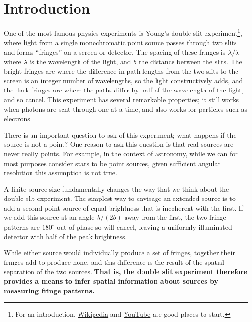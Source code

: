 \documentclass[11pt]{article}
\begin{document}
\section{Introduction}

One of the most famous physics experiments is Young's double slit experiment\footnote{For an introduction, \href{https://en.wikipedia.org/wiki/Double-slit_experiment}{Wikipedia} and \href{https://www.youtube.com/watch?v=A9tKncAdlHQ}{YouTube} are good places to start.}, where light from a single monochromatic point source passes through two slits and forms ``fringes'' on a screen or detector. The spacing of these fringes is $\lambda/b$, where $\lambda$ is the wavelength of the light, and $b$ the distance between the slits. The bright fringes are where the difference in path lengths from the two slits to the screen is an integer number of wavelengths, so the light constructively adds, and the dark fringes are where the paths differ by half of the wavelength of the light, and so cancel. This experiment has several \href{https://en.wikipedia.org/wiki/Double-slit_experiment}{remarkable properties}; it still works when photons are sent through one at a time, and also works for particles such as electrons.

There is an important question to ask of this experiment; what happens if the source is not a point? One reason to ask this question is that real sources are never really points. For example, in the context of astronomy, while we can for most purposes consider stars to be point sources, given sufficient angular resolution this assumption is not true.

A finite source size fundamentally changes the way that we think about the double slit experiment. The simplest way to envisage an extended source is to add a second point source of equal brightness that is incoherent with the first. If we add this source at an angle $\lambda/(2b)$ away from the first, the two fringe patterns are $180^\circ$ out of phase so will cancel, leaving a uniformly illuminated detector with half of the peak brightness.

\clearpage

While either source would individually produce a set of fringes, together their fringes add to produce none, and this difference is the result of the spatial separation of the two sources. \textbf{That is, the double slit experiment therefore provides a means to infer spatial information about sources by measuring fringe patterns.}
\end{document}
